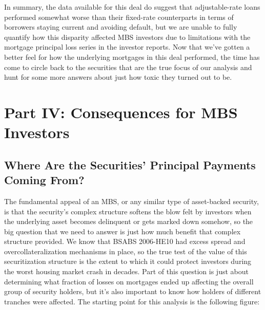\documentclass[12pt]{article}
\begin{document}
In summary, the data available for this deal do suggest that adjustable-rate loans performed somewhat worse than their fixed-rate counterparts in terms of borrowers staying current and avoiding default, but we are unable to fully quantify how this disparity affected MBS investors due to limitations with the mortgage principal loss series in the investor reports. Now that we’ve gotten a better feel for how the underlying mortgages in this deal performed, the time has come to circle back to the securities that are the true focus of our analysis and hunt for some more answers about just how toxic they turned out to be.


\section*{Part IV: Consequences for MBS Investors}

\subsection*{Where Are the Securities' Principal Payments Coming From?}

The fundamental appeal of an MBS, or any similar type of asset-backed security, is that the security’s complex structure softens the blow felt by investors when the underlying asset becomes delinquent or gets marked down somehow, so the big question that we need to answer is just how much benefit that complex structure provided. We know that BSABS 2006-HE10 had excess spread and overcollateralization mechanisms in place, so the true test of the value of this securitization structure is the extent to which it could protect investors during the worst housing market crash in decades. Part of this question is just about determining what fraction of losses on mortgages ended up affecting the overall group of security holders, but it’s also important to know how holders of different tranches were affected. The starting point for this analysis is the following figure: 
\end{document}
